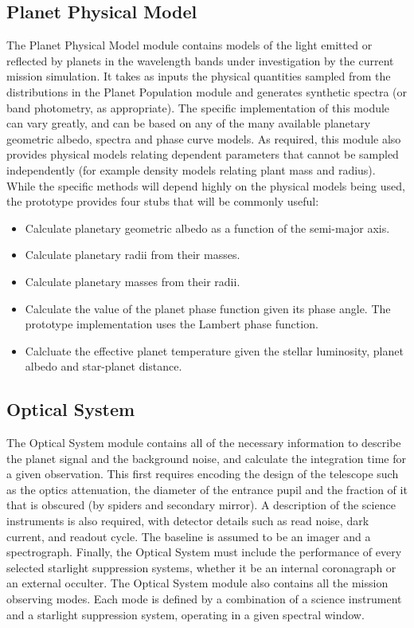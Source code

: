 \documentclass[cleanfoot]{asme2ej}
\begin{document}
\subsection{Planet Physical Model} \label{sec:planetphysicalmodel}
The Planet Physical Model module contains models of the light emitted or reflected by planets in the wavelength bands under investigation by the current mission simulation.  It takes as inputs the physical quantities sampled from the distributions in the Planet Population module and generates synthetic spectra (or band photometry, as appropriate).  The specific implementation of this module can vary greatly, and can be based on any of the many available planetary geometric albedo, spectra and phase curve models.  As required, this module also provides physical models relating dependent parameters that cannot be sampled independently (for example density models relating plant mass and radius).  While the specific methods will depend highly on the physical models being used, the prototype provides four stubs that will be commonly useful:

\begin{itemize}[leftmargin=2in,font={\ttfamily}]
    \item[\texttt calc\_albedo\_from\_sma] Calculate planetary geometric albedo as a function of the semi-major axis.
    \item[\texttt calc\_radius\_from\_mass] Calculate planetary radii from their masses.
    \item[\texttt calc\_mass\_from\_radius] Calculate planetary masses from their radii.
    \item[\texttt calc\_Phi] Calculate the value of the planet phase function given its phase angle. The prototype implementation uses the Lambert phase function.
    \item[\texttt calc\_Teff] Calcluate the effective planet temperature given the stellar luminosity, planet albedo and star-planet distance.
\end{itemize}



\subsection{Optical System}
The Optical System module contains all of the necessary information to describe the planet signal and the background noise, and calculate the integration time for a given observation.  This first requires encoding the design of the telescope such as the optics attenuation, the diameter of the entrance pupil and the fraction of it that is obscured (by spiders and secondary mirror). A description of the science instruments is also required, with detector details such as read noise, dark current, and readout cycle. The baseline is assumed to be an imager and a spectrograph. Finally, the Optical System must include the performance of every selected starlight suppression systems, whether it be an internal coronagraph or an external occulter. The Optical System module also contains all the mission observing modes. Each mode is defined by a combination of a science instrument and a starlight suppression system, operating in a given spectral window.
\end{document}
